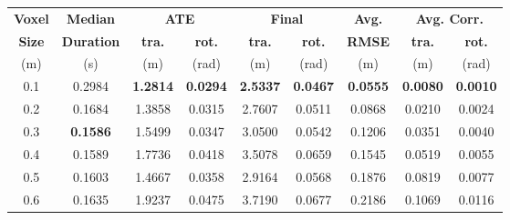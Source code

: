 \begin{table}[h]

    \centering
    {\small
        \begin{tabular}{c|c|cc|cc|c|cc}
            \hline
            \textbf{Voxel} & \textbf{Median}   & \multicolumn{2}{c|}{ \textbf{ATE}} & \multicolumn{2}{c|}{ \textbf{Final}} & \textbf{Avg.}   & \multicolumn{2}{c}{ \textbf{Avg. Corr.}}                                                       \\
            \textbf{Size}  & \textbf{Duration} & \textbf{tra.}                      & \textbf{rot.}                        & \textbf{tra.}   & \textbf{rot.}                            & \textbf{RMSE}   & \textbf{tra.}   & \textbf{rot.}   \\
            (m)            & (s)               & (m)                                & (rad)                                & (m)             & (rad)                                    & (m)             & (m)             & (rad)           \\
            \hline
            \hline
            0.1            & 0.2984            & \textbf{1.2814}                    & \textbf{0.0294}                      & \textbf{2.5337} & \textbf{0.0467}                          & \textbf{0.0555} & \textbf{0.0080} & \textbf{0.0010} \\
            0.2            & 0.1684            & 1.3858                             & 0.0315                               & 2.7607          & 0.0511                                   & 0.0868          & 0.0210          & 0.0024          \\
            0.3            & \textbf{0.1586}   & 1.5499                             & 0.0347                               & 3.0500          & 0.0542                                   & 0.1206          & 0.0351          & 0.0040          \\
            0.4            & 0.1589            & 1.7736                             & 0.0418                               & 3.5078          & 0.0659                                   & 0.1545          & 0.0519          & 0.0055          \\
            0.5            & 0.1603            & 1.4667                             & 0.0358                               & 2.9164          & 0.0568                                   & 0.1876          & 0.0819          & 0.0077          \\
            0.6            & 0.1635            & 1.9237                             & 0.0475                               & 3.7190          & 0.0677                                   & 0.2186          & 0.1069          & 0.0116          \\

\end{tabular}}
\end{table}
